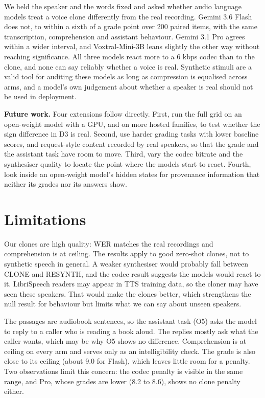We held the speaker and the words fixed and asked whether audio language models treat a voice clone differently from the real recording. Gemini 3.6 Flash does not, to within a sixth of a grade point over 200 paired items, with the same transcription, comprehension and assistant behaviour. Gemini 3.1 Pro agrees within a wider interval, and Voxtral-Mini-3B leans slightly the other way without reaching significance. All three models react more to a 6 kbps codec than to the clone, and none can say reliably whether a voice is real. Synthetic stimuli are a valid tool for auditing these models as long as compression is equalised across arms, and a model's own judgement about whether a speaker is real should not be used in deployment.

\textbf{Future work.} Four extensions follow directly. First, run the full grid on an open-weight model with a GPU, and on more hosted families, to test whether the sign difference in D3 is real. Second, use harder grading tasks with lower baseline scores, and request-style content recorded by real speakers, so that the grade and the assistant task have room to move. Third, vary the codec bitrate and the synthesiser quality to locate the point where the models start to react. Fourth, look inside an open-weight model's hidden states for provenance information that neither its grades nor its answers show.

\section*{Limitations}

Our clones are high quality: WER matches the real recordings and comprehension is at ceiling. The results apply to good zero-shot clones, not to synthetic speech in general. A weaker synthesiser would probably fall between CLONE and RESYNTH, and the codec result suggests the models would react to it. LibriSpeech readers may appear in TTS training data, so the cloner may have seen these speakers. That would make the clones better, which strengthens the null result for behaviour but limits what we can say about unseen speakers.

The passages are audiobook sentences, so the assistant task (O5) asks the model to reply to a caller who is reading a book aloud. The replies mostly ask what the caller wants, which may be why O5 shows no difference. Comprehension is at ceiling on every arm and serves only as an intelligibility check. The grade is also close to its ceiling (about 9.0 for Flash), which leaves little room for a penalty. Two observations limit this concern: the codec penalty is visible in the same range, and Pro, whose grades are lower (8.2 to 8.6), shows no clone penalty either.

